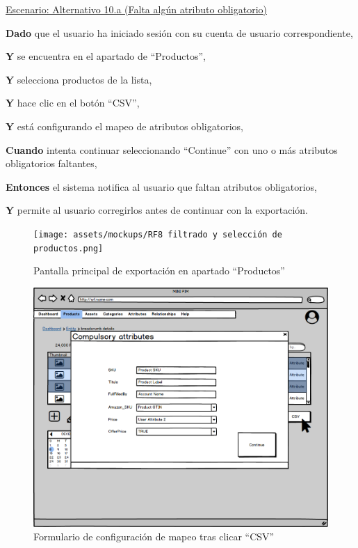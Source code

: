 \vspace{0.20cm}

\underline{Escenario: Alternativo 10.a (Falta algún atributo obligatorio)}\par
\vspace{0.15cm}
\textbf{Dado} que el usuario ha iniciado sesión con su cuenta de usuario correspondiente,\par
\textbf{Y} se encuentra en el apartado de \enquote{Productos},\par
\textbf{Y} selecciona productos de la lista,\par
\textbf{Y} hace clic en el botón \enquote{CSV},\par
\textbf{Y} está configurando el mapeo de atributos obligatorios,\par
\textbf{Cuando} intenta continuar seleccionando \enquote{Continue} con uno o más atributos obligatorios faltantes,\par
\textbf{Entonces} el sistema notifica al usuario que faltan atributos obligatorios,\par
\textbf{Y} permite al usuario corregirlos antes de continuar con la exportación.\par


\begin{figure}[H]
    \texttt{[image: assets/mockups/RF8 filtrado y selección de productos.png]}
    \caption{Pantalla principal de exportación en apartado \enquote{Productos}}
\end{figure}

\begin{figure}[H]
    \includegraphics[width=1\linewidth]{assets/mockups/RF8 Seleccion de atributos obligatorios.png}
    \caption{Formulario de configuración de mapeo tras clicar \enquote{CSV}}
\end{figure}

